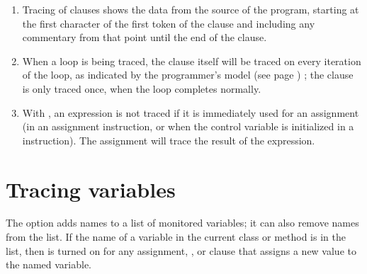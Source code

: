 \begin{enumerate}
\item Tracing of clauses shows the data from the source of the program,
starting at the first character of the first token of the clause and
including any commentary from that point until the end of the clause.
\item When a loop is being traced, the  clause itself will be
traced on every iteration of the loop, as indicated by the
 programmer's model (see page \pageref{refloopmod}) ; the  clause is only
traced once, when the loop completes normally.
\item With , an expression is not traced if it is
immediately used for an assignment (in an assignment instruction, or
when the control variable is initialized in a 
instruction).
The assignment will trace the result of the expression.
\end{enumerate}
\section{Tracing variables}
 
The  option adds names to a list of monitored
variables; it can also remove names from the list.  If the name of a
variable in the current class or method is in the list, then  is turned on for any assignment, , or
 clause that assigns a new value to the named
variable.
 
